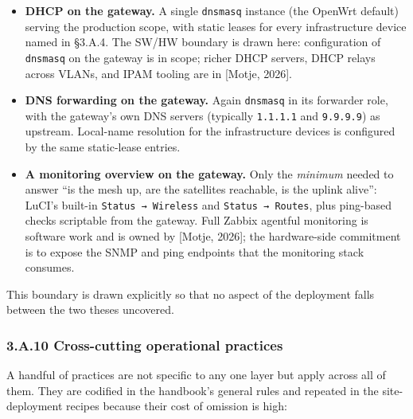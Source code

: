 \begin{itemize}
\tightlist
\item
  \textbf{DHCP on the gateway.} A single \texttt{dnsmasq} instance (the
  OpenWrt default) serving the production scope, with static leases for
  every infrastructure device named in §3.A.4. The SW/HW boundary is
  drawn here: configuration of \texttt{dnsmasq} on the gateway is in
  scope; richer DHCP servers, DHCP relays across VLANs, and IPAM tooling
  are in {[}Motje, 2026{]}.
\item
  \textbf{DNS forwarding on the gateway.} Again \texttt{dnsmasq} in its
  forwarder role, with the gateway's own DNS servers (typically
  \texttt{1.1.1.1} and \texttt{9.9.9.9}) as upstream. Local-name
  resolution for the infrastructure devices is configured by the same
  static-lease entries.
\item
  \textbf{A monitoring overview on the gateway.} Only the \emph{minimum}
  needed to answer ``is the mesh up, are the satellites reachable, is
  the uplink alive'': LuCI's built-in \texttt{Status\ →\ Wireless} and
  \texttt{Status\ →\ Routes}, plus ping-based checks scriptable from the
  gateway. Full Zabbix agentful monitoring is software work and is owned
  by {[}Motje, 2026{]}; the hardware-side commitment is to expose the
  SNMP and ping endpoints that the monitoring stack consumes.
\end{itemize}

This boundary is drawn explicitly so that no aspect of the deployment
falls between the two theses uncovered.

\hypertarget{a.10-cross-cutting-operational-practices}{%
\subsubsection{3.A.10 Cross-cutting operational
practices}\label{a.10-cross-cutting-operational-practices}}

A handful of practices are not specific to any one layer but apply
across all of them. They are codified in the handbook's general rules
and repeated in the site-deployment recipes because their cost of
omission is high:

